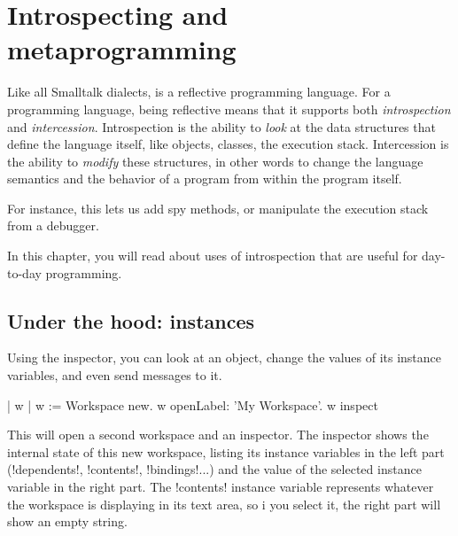 \documentclass[a4paper,10pt,twoside]{book}
\begin{document}
	\sloppy
\fi
\chapter{Introspecting and metaprogramming}\label{cha:metaprog}



Like all Smalltalk dialects, \squeak is a reflective programming language.
For a programming language, being reflective means that it supports both \emph{introspection} and \emph{intercession}.
Introspection is the ability to \emph{look} at the data structures that define the language itself, like objects, classes, the execution stack.
Intercession is the ability to \emph{modify} these structures, in other words to change the language semantics and the behavior of a program from within the program itself.

For instance, this lets us add spy methods, or manipulate the execution stack from a debugger.

In this chapter, you will read about uses of introspection that are useful for day-to-day programming.

\section{Under the hood: instances} %

Using the inspector, you can look at an object, change the values of its instance variables, and even send messages to it.

\begin{code}{| w |}
w := Workspace new.
w openLabel: 'My Workspace'.
w inspect
\end{code}

This will open a second workspace and an inspector.
The inspector shows the internal state of this new workspace, listing its instance variables in the left part (\ct!dependents!, \ct!contents!, \ct!bindings!...) and the value of the selected instance variable in the right part.
The \ct!contents! instance variable represents whatever the workspace is displaying in its text area, so i you select it, the right part will show an empty string.
\end{document}
